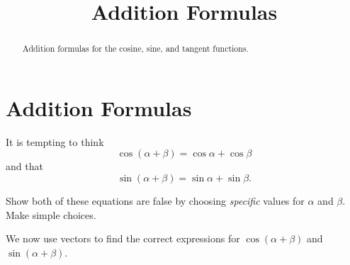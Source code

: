 \documentclass{ximera}
\title{Addition Formulas}
\begin{document}
\begin{abstract}
Addition formulas for the cosine, sine, and tangent functions.
\end{abstract}
\maketitle

\section{Addition Formulas}
It is tempting to think
\[
  \cos(\alpha + \beta) = \cos\alpha + \cos\beta
\]
and that
\[
 \sin(\alpha + \beta) = \sin\alpha + \sin\beta .
\]
\begin{question} \label{Qffee}
Show both of these equations are false by choosing \emph{specific} values for $\alpha$ and $\beta$. Make simple choices.
\begin{freeResponse}
\end{freeResponse}
\end{question}

We now use vectors to find the correct expressions for $\cos(\alpha + \beta)$ and $ \sin(\alpha + \beta)$.
\end{document}
